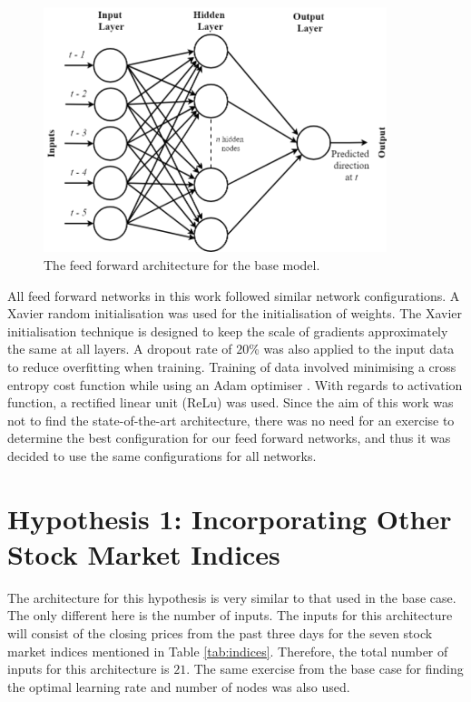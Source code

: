\documentclass{UoYCSproject}
\begin{document}
\begin{figure}[h]
\includegraphics[width=10cm]{Base_case_diagram.png}
\centering
\caption{The feed forward architecture for the base model.} 
\label{fig:basecase}
\end{figure}

All feed forward networks in this work followed similar network configurations. A Xavier \cite{glorot2010understanding} random initialisation was used for the initialisation of weights. The Xavier initialisation technique is designed to keep the scale of gradients approximately the same at all layers. A dropout rate of $20$\% was also applied to the input data to reduce overfitting when training. Training of data involved minimising a cross entropy cost function while using an Adam optimiser \cite{kingma2014adam}. With regards to activation function, a rectified linear unit (ReLu) was used. Since the aim of this work was not to find the state-of-the-art architecture, there was no need for an exercise to determine the best configuration for our feed forward networks, and thus it was decided to use the same configurations for all networks. 

\section{Hypothesis 1: Incorporating Other Stock Market Indices}
\label{sec:methodh1}
The architecture for this hypothesis is very similar to that used in the base case. The only different here is the number of inputs. The inputs for this architecture will consist of the closing prices from the past three days for the seven stock market indices mentioned in Table \ref{tab:indices}. Therefore, the total number of inputs for this architecture is $21$. The same exercise from the base case for finding the optimal learning rate and number of nodes was also used. 
\end{document}
